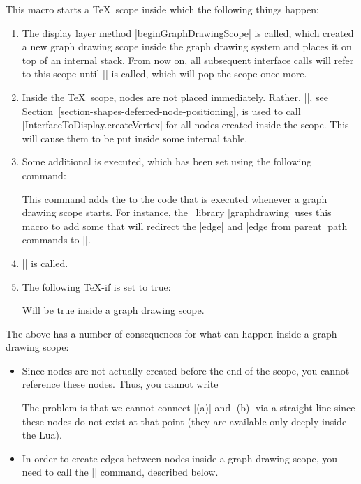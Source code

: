 \begin{command}{\pgfgdbeginscope}
  This macro starts a \TeX\ scope inside which the following things
  happen: 
  \begin{enumerate}
  \item The display layer method |beginGraphDrawingScope| is
    called, which created a new graph drawing scope inside the graph
    drawing system and places it on top of an internal stack. From now
    on, all subsequent interface calls will refer to this scope until
    |\pgfgdendscope| is called, which will pop the scope once more. 
  \item Inside the \TeX\ scope, nodes are not placed
    immediately. Rather,  |\pgfpositionnodelater|, see
    Section~\ref{section-shapes-deferred-node-positioning}, is used to
    call |InterfaceToDisplay.createVertex| for all nodes created
    inside the scope. This will cause them to be put inside some internal
    table. 
  \item Some additional  is executed, which has been set
    using the following command:
    \begin{command}{\pgfgdaddspecificationhook{}}
      This command adds the  to the code that is executed
      whenever a graph drawing scope starts. For instance, the
      \tikzname\ library |graphdrawing| uses this macro to add some
       that will redirect the |edge| and |edge from parent|
      path commands to |\pgfgdedge|.
    \end{command}
  \item |\pgftransformreset| is called.
  \item The following \TeX-if is set to true:
    {
      \let\ifpgfgdgraphdrawingscopeactive=\relax
      \begin{textoken}{\ifpgfgdgraphdrawingscopeactive}
        Will be true inside a graph drawing scope.
      \end{textoken}
    }
  \end{enumerate}
  The above has a number of consequences for what can happen inside a
  graph drawing scope:
  \begin{itemize}
  \item Since nodes are not actually created before the end of the
    scope, you cannot reference these nodes. Thus, you cannot write
\begin{codeexample}
\end{codeexample}
    The problem is that we cannot connect |(a)| and |(b)| via a
    straight line since these nodes do not exist at that point (they
    are available only deeply inside the Lua).
  \item In order to create edges between nodes inside a graph drawing
    scope, you need to call the |\pgfgdedge| command, described below.
  \end{itemize}
  

\end{command}
